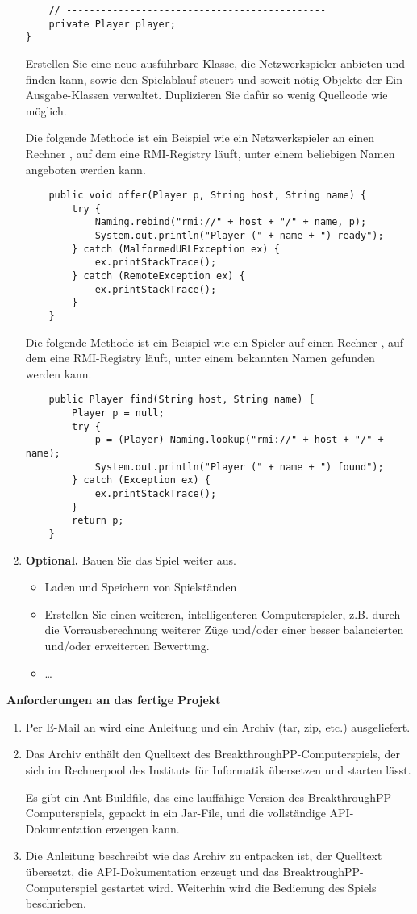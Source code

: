\begin{enumerate}
\begin{lstlisting}
	// ---------------------------------------------
	private Player player;
}
\end{lstlisting}
Erstellen Sie eine neue ausführbare Klasse, die Netzwerkspieler anbieten und finden kann, sowie den Spielablauf steuert und soweit nötig Objekte der Ein-Ausgabe-Klassen verwaltet. Duplizieren Sie dafür so wenig Quellcode wie möglich.

Die folgende Methode  ist ein Beispiel wie ein Netzwerkspieler an einen Rechner , auf dem eine RMI-Registry läuft, unter einem beliebigen Namen  angeboten werden kann.
\begin{lstlisting}
	public void offer(Player p, String host, String name) {
		try {
			Naming.rebind("rmi://" + host + "/" + name, p);
			System.out.println("Player (" + name + ") ready");
		} catch (MalformedURLException ex) {
			ex.printStackTrace();
		} catch (RemoteException ex) {
			ex.printStackTrace();
		}
	}
\end{lstlisting}
Die folgende Methode  ist ein Beispiel wie ein Spieler auf einen Rechner , auf dem eine RMI-Registry läuft, unter einem bekannten Namen  gefunden werden kann.
\begin{lstlisting}
	public Player find(String host, String name) {
		Player p = null;
		try {
			p = (Player) Naming.lookup("rmi://" + host + "/" + name);
			System.out.println("Player (" + name + ") found");
		} catch (Exception ex) {
			ex.printStackTrace();
		}
		return p;
	}
\end{lstlisting}
\item \textbf{Optional.} Bauen Sie das Spiel weiter aus.
\begin{itemize}
\item Laden und Speichern von Spielständen
\item Erstellen Sie einen weiteren, intelligenteren Computerspieler, z.B. durch die Vorrausberechnung weiterer Züge und/oder einer besser balancierten und/oder erweiterten Bewertung.
\item \dots
\end{itemize}
\end{enumerate}

\textbf{Anforderungen an das fertige Projekt}
\begin{enumerate}
\item Per E-Mail an  wird eine Anleitung und ein Archiv (tar, zip, etc.) ausgeliefert.
\item Das Archiv enthält den Quelltext des BreakthroughPP-Computerspiels, der sich im Rechnerpool des Instituts für Informatik übersetzen und starten lässt.

Es gibt ein Ant-Buildfile, das eine lauffähige Version des BreakthroughPP-Computerspiels, gepackt in ein Jar-File, und die vollständige API-Dokumentation erzeugen kann.
\item Die Anleitung beschreibt wie das Archiv zu entpacken ist, der Quelltext übersetzt, die API-Dokumentation erzeugt und das BreaktroughPP-Computerspiel gestartet wird. Weiterhin wird die Bedienung des Spiels beschrieben.
\end{enumerate}